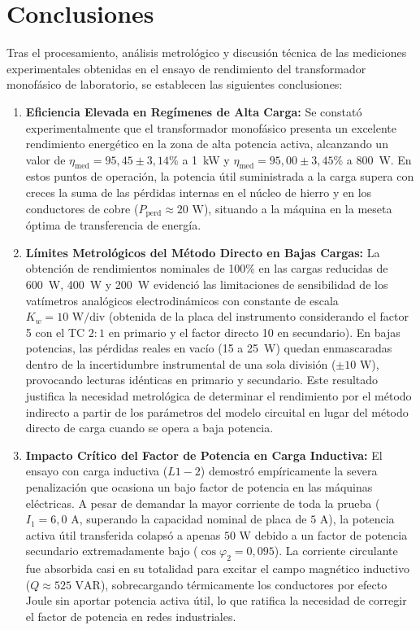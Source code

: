 \section{Conclusiones}

Tras el procesamiento, análisis metrológico y discusión técnica de las mediciones experimentales obtenidas en el ensayo de rendimiento del transformador monofásico de laboratorio, se establecen las siguientes conclusiones:

\begin{enumerate}
    \item \textbf{Eficiencia Elevada en Regímenes de Alta Carga:}
    Se constató experimentalmente que el transformador monofásico presenta un excelente rendimiento energético en la zona de alta potencia activa, alcanzando un valor de $\eta_{\text{med}} = 95{,}45 \pm 3{,}14\%$ a 1~kW y $\eta_{\text{med}} = 95{,}00 \pm 3{,}45\%$ a 800~W. En estos puntos de operación, la potencia útil suministrada a la carga supera con creces la suma de las pérdidas internas en el núcleo de hierro y en los conductores de cobre ($P_{\text{perd}} \approx 20\text{ W}$), situando a la máquina en la meseta óptima de transferencia de energía.

    \item \textbf{Límites Metrológicos del Método Directo en Bajas Cargas:}
    La obtención de rendimientos nominales de 100\% en las cargas reducidas de 600~W, 400~W y 200~W evidenció las limitaciones de sensibilidad de los vatímetros analógicos electrodinámicos con constante de escala $K_w = 10\text{ W/div}$ (obtenida de la placa del instrumento considerando el factor 5 con el TC $2:1$ en primario y el factor directo 10 en secundario). En bajas potencias, las pérdidas reales en vacío (15 a 25~W) quedan enmascaradas dentro de la incertidumbre instrumental de una sola división ($\pm 10\text{ W}$), provocando lecturas idénticas en primario y secundario. Este resultado justifica la necesidad metrológica de determinar el rendimiento por el método indirecto a partir de los parámetros del modelo circuital en lugar del método directo de carga cuando se opera a baja potencia.

    \item \textbf{Impacto Crítico del Factor de Potencia en Carga Inductiva:}
    El ensayo con carga inductiva ($L1-2$) demostró empíricamente la severa penalización que ocasiona un bajo factor de potencia en las máquinas eléctricas. A pesar de demandar la mayor corriente de toda la prueba ($I_1 = 6{,}0\text{ A}$, superando la capacidad nominal de placa de $5\text{ A}$), la potencia activa útil transferida colapsó a apenas $50\text{ W}$ debido a un factor de potencia secundario extremadamente bajo ($\cos\varphi_2 = 0{,}095$). La corriente circulante fue absorbida casi en su totalidad para excitar el campo magnético inductivo ($Q \approx 525\text{ VAR}$), sobrecargando térmicamente los conductores por efecto Joule sin aportar potencia activa útil, lo que ratifica la necesidad de corregir el factor de potencia en redes industriales.


\end{enumerate}
